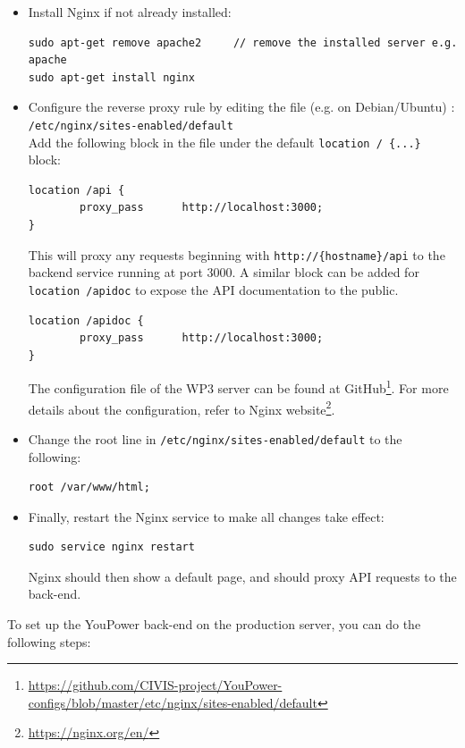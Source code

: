 \begin{itemize}

\item Install Nginx if not already installed: 
\begin{lstlisting}
sudo apt-get remove apache2   	// remove the installed server e.g. apache
sudo apt-get install nginx 
\end{lstlisting}

\item Configure the reverse proxy rule by editing the file (e.g. on Debian/Ubuntu) : \\
\texttt{\small /etc/nginx/sites-enabled/default} \\
Add the following block in the file under the default  \texttt{\small location / \{...\} } block:
\begin{lstlisting}
location /api {
        proxy_pass      http://localhost:3000; 
}
\end{lstlisting}
This will proxy any requests beginning with \texttt{\small http://\{hostname\}/api} to the backend service running at port 3000. A similar block can be added for \texttt{\small location /apidoc} to expose the API documentation to the public.
\begin{lstlisting}
location /apidoc {
        proxy_pass      http://localhost:3000; 
}
\end{lstlisting}
The configuration file of the WP3 server can be found at GitHub\footnote{\url{https://github.com/CIVIS-project/YouPower-configs/blob/master/etc/nginx/sites-enabled/default}}. 
For more details about the configuration, refer to Nginx website\footnote{\url{https://nginx.org/en/}}. 

\item Change the root line in \texttt{\small /etc/nginx/sites-enabled/default} to the following:
\begin{lstlisting}
root /var/www/html;
\end{lstlisting}

\item Finally, restart the Nginx service to make all changes take effect:
\begin{lstlisting}
sudo service nginx restart
\end{lstlisting}
Nginx should then show a default page, and should proxy API requests to the back-end.

\end{itemize}

\noindent To set up the YouPower back-end on the production server, you can do the following steps: 

